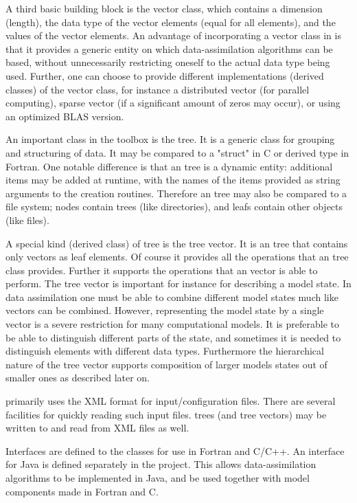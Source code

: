 A third basic building block is the \oda vector class, which contains a dimension (length), the data type of the vector elements (equal for all elements), and the values of the vector elements. An advantage of incorporating a vector class in \oda is that it provides a generic entity on which data-assimilation algorithms can be based, without unnecessarily restricting oneself to the actual data type being used. Further, one can choose to provide different implementations (derived classes) of the vector class, for instance a distributed vector (for parallel computing), sparse vector (if a significant amount of zeros may occur), or using an optimized BLAS version.

An important class in the \oda toolbox is the \oda tree. It is a generic class for grouping and structuring of data. It may be compared to a "struct" in C or derived type in Fortran. One notable difference is that an \oda tree is a dynamic entity: additional items may be added at runtime, with the names of the items provided as string arguments to the creation routines. Therefore an \oda tree may also be compared to a file system; nodes contain \oda trees (like directories), and leafs contain other \oda objects (like files).

A special kind (derived class) of \oda tree is the \oda tree vector. It is an \oda tree that contains only \oda vectors as leaf elements. Of course it provides all the operations that an \oda tree class provides. Further it supports the operations that an \oda vector is able to perform. The \oda tree vector is important for instance for describing a model state. In data assimilation one must be able to combine different model states much like vectors can be combined. However, representing the model state by a single vector is a severe restriction for many computational models. It is preferable to be able to distinguish different parts of the state, and sometimes it is needed to distinguish elements with different data types. Furthermore the hierarchical nature of the \oda tree vector supports composition of larger models states out of smaller ones as described later on.

\oda primarily uses the XML format for input/configuration files. There are several facilities for quickly reading such input files. \oda trees (and tree vectors) may be written to and read from XML files as well.

Interfaces are defined to the \oda classes for use in Fortran and C/C++. An interface for Java is defined separately in the \oda project. This allows data-assimilation algorithms to be implemented in Java, and be used together with model components made in Fortran and C.

